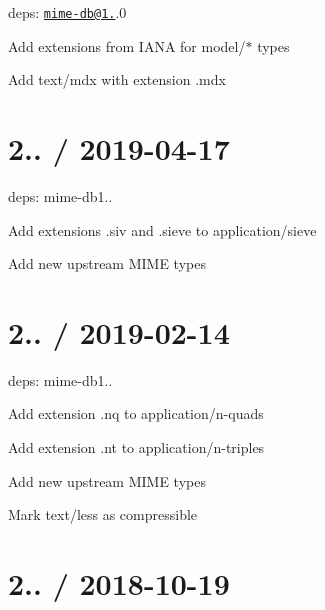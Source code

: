
\begin{DoxyItemize}
\item deps\+: \href{mailto:mime-db@1.40}{\tt mime-\/db@1.}.0
\begin{DoxyItemize}
\item Add extensions from I\+A\+NA for {\ttfamily model/$\ast$} types
\item Add {\ttfamily text/mdx} with extension {\ttfamily .mdx}
\end{DoxyItemize}
\end{DoxyItemize}

\section*{2.. / 2019-\/04-\/17 }


\begin{DoxyItemize}
\item deps\+: mime-\/db1..
\begin{DoxyItemize}
\item Add extensions {\ttfamily .siv} and {\ttfamily .sieve} to {\ttfamily application/sieve}
\item Add new upstream M\+I\+ME types
\end{DoxyItemize}
\end{DoxyItemize}

\section*{2.. / 2019-\/02-\/14 }


\begin{DoxyItemize}
\item deps\+: mime-\/db1..
\begin{DoxyItemize}
\item Add extension {\ttfamily .nq} to {\ttfamily application/n-\/quads}
\item Add extension {\ttfamily .nt} to {\ttfamily application/n-\/triples}
\item Add new upstream M\+I\+ME types
\item Mark {\ttfamily text/less} as compressible
\end{DoxyItemize}
\end{DoxyItemize}

\section*{2.. / 2018-\/10-\/19 }



